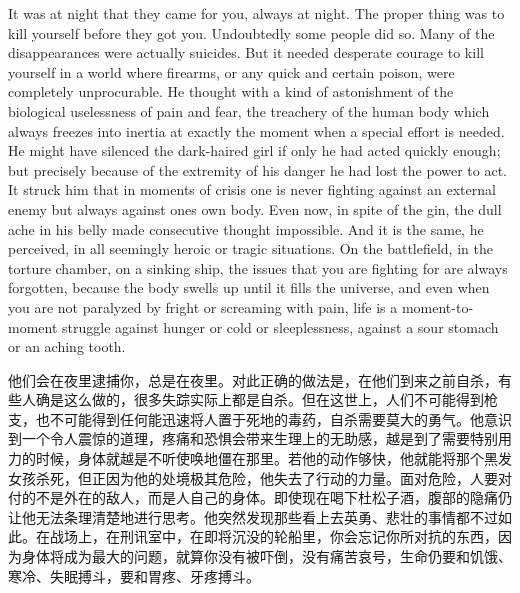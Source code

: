 \begin{paracol}{2}
\switchcolumn*

It was at night that they came for you, always at night. The proper
thing was to kill yourself before they got you. Undoubtedly some people
did so. Many of the disappearances were actually suicides. But it needed
desperate courage to kill yourself in a world where firearms, or any
quick and certain poison, were completely unprocurable. He thought with
a kind of astonishment of the biological uselessness of pain and fear,
the treachery of the human body which always freezes into inertia at
exactly the moment when a special effort is needed. He might have
silenced the dark-haired girl if only he had acted quickly enough; but
precisely because of the extremity of his danger he had lost the power
to act. It struck him that in moments of crisis one is never fighting
against an external enemy but always against one\textquotesingle s own
body. Even now, in spite of the gin, the dull ache in his belly made
consecutive thought impossible. And it is the same, he perceived, in all
seemingly heroic or tragic situations. On the battlefield, in the
torture chamber, on a sinking ship, the issues that you are fighting for
are always forgotten, because the body swells up until it fills the
universe, and even when you are not paralyzed by fright or screaming
with pain, life is a moment-to-moment struggle against hunger or cold or
sleeplessness, against a sour stomach or an aching tooth.

\switchcolumn

他们会在夜里逮捕你，总是在夜里。对此正确的做法是，在他们到来之前自杀，有些人确是这么做的，很多失踪实际上都是自杀。但在这世上，人们不可能得到枪支，也不可能得到任何能迅速将人置于死地的毒药，自杀需要莫大的勇气。他意识到一个令人震惊的道理，疼痛和恐惧会带来生理上的无助感，越是到了需要特别用力的时候，身体就越是不听使唤地僵在那里。若他的动作够快，他就能将那个黑发女孩杀死，但正因为他的处境极其危险，他失去了行动的力量。面对危险，人要对付的不是外在的敌人，而是人自己的身体。即使现在喝下杜松子酒，腹部的隐痛仍让他无法条理清楚地进行思考。他突然发现那些看上去英勇、悲壮的事情都不过如此。在战场上，在刑讯室中，在即将沉没的轮船里，你会忘记你所对抗的东西，因为身体将成为最大的问题，就算你没有被吓倒，没有痛苦哀号，生命仍要和饥饿、寒冷、失眠搏斗，要和胃疼、牙疼搏斗。

\switchcolumn*


\end{paracol}
